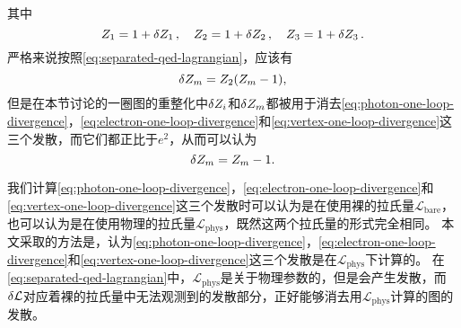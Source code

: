 \documentclass[hyperref, UTF8, a4paper]{ctexart}
\begin{document}
其中
\begin{equation}
    Z_1 = 1 + \var{Z_1}, \quad Z_2 = 1 + \var{Z_2}, \quad Z_3 = 1 + \var{Z_3}.
\end{equation}
严格来说按照\eqref{eq:separated-qed-lagrangian}，应该有
\begin{equation}
    \var{Z_m} = Z_2 (Z_m - 1),
\end{equation}
但是在本节讨论的一圈图的重整化中$\var{Z_i}$和$\var{Z_m}$都被用于消去\eqref{eq:photon-one-loop-divergence}，\eqref{eq:electron-one-loop-divergence}和\eqref{eq:vertex-one-loop-divergence}这三个发散，而它们都正比于$e^2$，从而可以认为
\begin{equation}
    \var{Z_m} = Z_m - 1.
\end{equation}

我们计算\eqref{eq:photon-one-loop-divergence}，\eqref{eq:electron-one-loop-divergence}和\eqref{eq:vertex-one-loop-divergence}这三个发散时可以认为是在使用裸的拉氏量$\mathcal{L}_\text{bare}$，也可以认为是在使用物理的拉氏量$\mathcal{L}_\text{phys}$，既然这两个拉氏量的形式完全相同。
本文采取的方法是，认为\eqref{eq:photon-one-loop-divergence}，\eqref{eq:electron-one-loop-divergence}和\eqref{eq:vertex-one-loop-divergence}这三个发散是在$\mathcal{L}_\text{phys}$下计算的。
在\eqref{eq:separated-qed-lagrangian}中，$\mathcal{L}_\text{phys}$是关于物理参数的，但是会产生发散，而$\var{\mathcal{L}}$对应着裸的拉氏量中无法观测到的发散部分，正好能够消去用$\mathcal{L}_\text{phys}$计算的图的发散。
\end{document}
